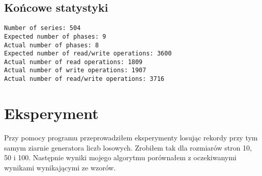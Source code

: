 \documentclass{article}
\begin{document}
\subsection{Końcowe statystyki}
\begin{lstlisting}
Number of series: 504
Expected number of phases: 9
Actual number of phases: 8
Expected number of read/write operations: 3600
Actual number of read operations: 1809
Actual number of write operations: 1907
Actual number of read/write operations: 3716
\end{lstlisting}

\section{Eksperyment}
Przy pomocy programu przeprowadziłem eksperymenty losując rekordy przy tym samym ziarnie generatora liczb losowych. Zrobiłem tak dla rozmiarów stron 10, 50 i 100.  Następnie wyniki mojego algorytmu porównałem z oczekiwanymi wynikami wynikającymi ze wzorów.
\end{document}
